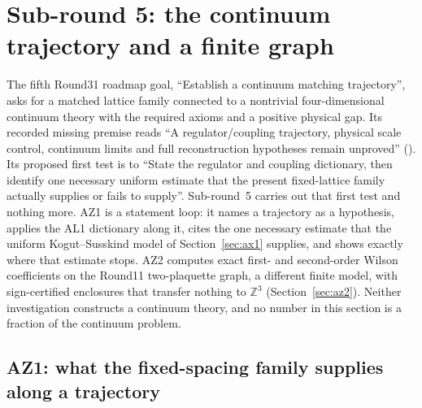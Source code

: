 \section{Sub-round 5: the continuum trajectory and a finite graph}
\label{sec:continuum}

The fifth Round31 roadmap goal, ``Establish a continuum matching
trajectory'', asks for a matched lattice family connected to a nontrivial
four-dimensional continuum theory with the required axioms and a positive
physical gap. Its recorded missing premise reads ``A regulator/coupling
trajectory, physical scale control, continuum limits and full reconstruction
hypotheses remain unproved''
(). Its proposed
first test is to ``State the regulator and coupling dictionary, then identify
one necessary uniform estimate that the present fixed-lattice family actually
supplies or fails to supply''. Sub-round~5 carries out that first test and
nothing more. AZ1 is a statement loop: it names a trajectory as a hypothesis,
applies the AL1 dictionary along it, cites the one necessary estimate that the
uniform Kogut--Susskind model of Section~\ref{sec:ax1} supplies, and shows
exactly where that estimate stops. AZ2 computes exact first- and
second-order Wilson coefficients on the Round11 two-plaquette graph, a
different finite model, with sign-certified enclosures that transfer nothing
to $\mathbb Z^3$ (Section~\ref{sec:az2}).
Neither investigation constructs a continuum theory, and no number in this
section is a fraction of the continuum problem.

\subsection{AZ1: what the fixed-spacing family supplies along a trajectory}
\label{sec:az1}


